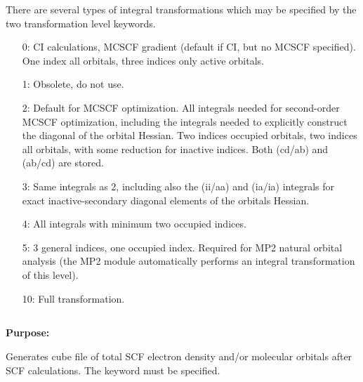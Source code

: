 There are several types of integral transformations which may be
specified by the two transformation level keywords.
\begin{itemize}
   \item[0:] CI calculations, MCSCF gradient (default if CI, but
             no MCSCF specified).
             One index all orbitals, three indices only active
             orbitals.

   \item[1:] Obsolete, do not use.

   \item[2:] Default for MCSCF optimization. All integrals needed for {\sir}
             second-order MCSCF optimization, including the integrals
             needed to explicitly construct the diagonal of the orbital
             Hessian. Two indices occupied orbitals, two indices all
             orbitals, with some reduction for inactive indices.
             Both (cd/ab) and (ab/cd) are stored.

   \item[3:] Same integrals as 2, including also the (ii/aa) and
             (ia/ia) integrals for exact inactive-secondary diagonal elements
             of the orbitals Hessian.

   \item[4:] All integrals with minimum two occupied indices.

   \item[5:] 3 general indices, one occupied index.  Required for MP2
             natural orbital analysis (the MP2 module automatically
             performs an integral transformation of this level).

  \item[10:] Full transformation.
\end{itemize}


\pagebreak[3]
\subsection{\label{ref-cube}}

{\bf Purpose:}

Generates cube file of total SCF electron density and/or
molecular orbitals after SCF calculations. The keyword 
must be specified.

